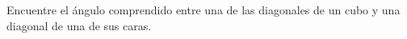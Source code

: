 \item Encuentre el ángulo comprendido entre una de las diagonales de un cubo y una diagonal de una de sus caras.
